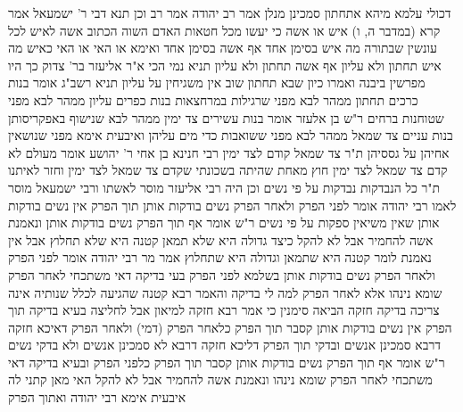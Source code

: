 \documentclass[12pt, openany]{book}
\begin{document}
{דכולי עלמא מיהא אתחתון סמכינן מנלן  אמר רב יהודה אמר רב וכן תנא דבי ר' ישמעאל  אמר קרא (במדבר ה, ו) איש או אשה כי יעשו מכל חטאות האדם השוה הכתוב אשה לאיש לכל עונשין שבתורה מה איש בסימן אחד אף אשה בסימן אחד 
ואימא  או האי או האי  כאיש מה איש תחתון ולא עליון אף אשה תחתון ולא עליון 
תניא נמי הכי א"ר אליעזר בר' צדוק כך היו מפרשין ביבנה ואמרו  כיון שבא תחתון שוב אין משגיחין על עליון 
תניא רשב"ג אומר  בנות כרכים תחתון ממהר לבא מפני שרגילות במרחצאות  בנות כפרים עליון ממהר לבא מפני שטוחנות ברחים 
ר"ש בן אלעזר אומר  בנות עשירים צד ימין ממהר לבא שנישוף באפקריסותן  בנות עניים צד שמאל ממהר לבא מפני ששואבות כדי מים עליהן ואיבעית אימא  מפני שנושאין אחיהן על גססיהן 
ת"ר צד שמאל קודם לצד ימין רבי חנינא בן אחי ר' יהושע אומר  מעולם לא קדם צד שמאל לצד ימין חוץ מאחת שהיתה בשכונתי שקדם צד שמאל לצד ימין וחזר לאיתנו 
ת"ר כל הנבדקות נבדקות על פי נשים וכן היה רבי אליעזר מוסר לאשתו ורבי ישמעאל מוסר לאמו 
רבי יהודה אומר  לפני הפרק ולאחר הפרק נשים בודקות אותן תוך הפרק אין נשים בודקות אותן שאין משיאין ספקות על פי נשים  ר"ש אומר  אף תוך הפרק נשים בודקות אותן  ונאמנת אשה להחמיר אבל לא להקל 
כיצד גדולה היא שלא תמאן קטנה היא שלא תחלוץ 
אבל אין נאמנת לומר קטנה היא שתמאן וגדולה היא שתחלוץ 
אמר מר רבי יהודה אומר  לפני הפרק ולאחר הפרק נשים בודקות אותן  בשלמא לפני הפרק בעי בדיקה דאי משתכחי לאחר הפרק שומא נינהו 
אלא לאחר הפרק למה לי בדיקה  והאמר רבא  קטנה שהגיעה לכלל שנותיה אינה צריכה בדיקה חזקה הביאה סימנין  כי אמר רבא חזקה למיאון אבל לחליצה בעיא בדיקה 
תוך הפרק אין נשים בודקות אותן קסבר  תוך הפרק כלאחר הפרק (דמי)
ולאחר הפרק דאיכא חזקה דרבא סמכינן אנשים ובדקי תוך הפרק דליכא חזקה דרבא לא סמכינן אנשים ולא בדקי נשים 
ר"ש אומר  אף תוך הפרק נשים בודקות אותן קסבר  תוך הפרק כלפני הפרק ובעיא בדיקה דאי משתכחי לאחר הפרק שומא נינהו 
ונאמנת אשה להחמיר אבל לא להקל  האי מאן קתני לה  איבעית אימא  רבי יהודה ואתוך הפרק}
\end{document}
